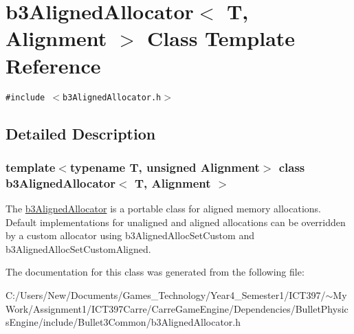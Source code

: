 \hypertarget{classb3_aligned_allocator}{
\section{b3AlignedAllocator$<$ T, Alignment $>$ Class Template Reference}
\label{classb3_aligned_allocator}
}
{\tt \#include $<$b3AlignedAllocator.h$>$}



\subsection{Detailed Description}
\subsubsection*{template$<$typename T, unsigned Alignment$>$ class b3AlignedAllocator$<$ T, Alignment $>$}

The \hyperlink{classb3_aligned_allocator}{b3AlignedAllocator} is a portable class for aligned memory allocations. Default implementations for unaligned and aligned allocations can be overridden by a custom allocator using b3AlignedAllocSetCustom and b3AlignedAllocSetCustomAligned. 

The documentation for this class was generated from the following file:\begin{CompactItemize}
\item 
C:/Users/New/Documents/Games\_\-Technology/Year4\_\-Semester1/ICT397/$\sim$My Work/Assignment1/ICT397Carre/CarreGameEngine/Dependencies/BulletPhysicsEngine/include/Bullet3Common/b3AlignedAllocator.h\end{CompactItemize}
